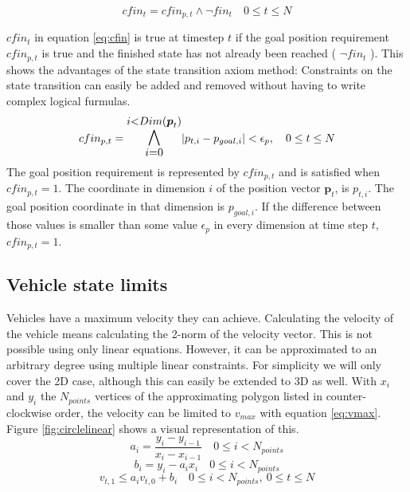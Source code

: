 \begin{equation}
\label{eq:cfin}
cfin_t =  cfin_{p,t} \wedge \neg fin_t\quad 0 \leq t \leq N
\end{equation}

 $cfin_t$ in equation \ref{eq:cfin} is true at timestep $t$ if the goal position requirement $cfin_{p,t}$ is true and the finished state has not already been reached ( $ \neg fin_t$ ). This shows the advantages of the state transition axiom method: Constraints on the state transition can easily be added and removed without having to write complex logical furmulas.
\begin{equation}
\label{eq:cfin-p}
cfin_{p,t} =  \mathlarger{\mathlarger{\bigwedge_{i = 0}^{i < Dim(\boldsymbol{p}_t)}}} |p_{t,i} - p_{goal, i}| < \epsilon_{p},  \quad 0 \leq t \leq N
\end{equation}
The goal position requirement is represented by $cfin_{p,t}$ and is satisfied when $cfin_{p,t} = 1$. The coordinate in dimension $i$ of the position vector $\boldsymbol{p}_t$, is $p_{t,i}$. The goal position coordinate in that dimension is $p_{goal, i}$. If the difference between those values is smaller than some value $\epsilon_p$ in every dimension at time step $t$,  $cfin_{p,t} = 1$.

\subsection{Vehicle state limits}

Vehicles have a maximum velocity they can achieve. Calculating the velocity of the vehicle means calculating the 2-norm of the velocity vector. This is not possible using only linear equations. However, it can be approximated to an arbitrary degree using multiple linear constraints. For simplicity we will only cover the 2D case, although this can easily be extended to 3D as well. With $x_i$ and $y_i$ the $N_{points}$ vertices of the approximating polygon listed in counter-clockwise order, the velocity can be limited to $v_{max}$ with equation \ref{eq:vmax}. Figure \ref{fig:circlelinear} shows a visual representation of this.
\begin{equation}
\label{eq:lin-a}
a_i = \dfrac{y_{i} - y_{i-1}}{x_{i} - x_{i-1}} \quad 0 \leq i < N_{points}
\end{equation}
\begin{equation}
\label{eq:lin-b}
b_i = y_{i} - a_i x_i  \quad 0 \leq i < N_{points}
\end{equation}
\begin{equation}
\label{eq:vmax}
v_{t, 1} \leq a_i v_{t,0} + b_i  \quad 0 \leq i < N_{points}, ~ 0 \leq t \leq N
\end{equation}

